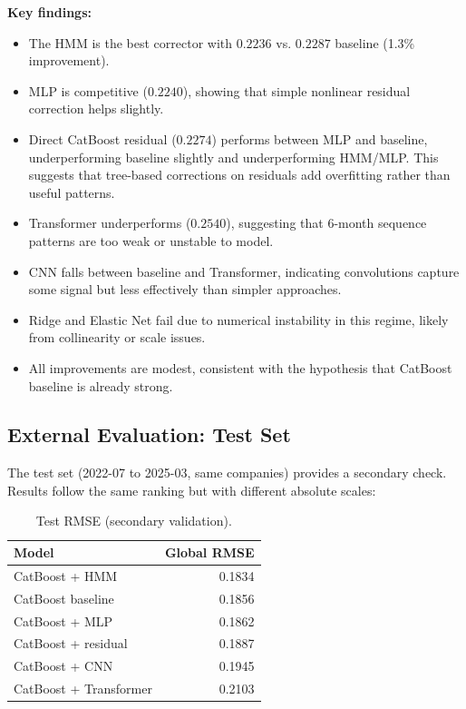 \documentclass[11pt]{article}
\begin{document}
\textbf{Key findings:}
\begin{itemize}[leftmargin=1.2em]
    \item The HMM is the best corrector with $0.2236$ vs. $0.2287$ baseline (1.3\% improvement).
    \item MLP is competitive ($0.2240$), showing that simple nonlinear residual correction helps slightly.
    \item Direct CatBoost residual ($0.2274$) performs between MLP and baseline, underperforming baseline slightly and underperforming HMM/MLP. This suggests that tree-based corrections on residuals add overfitting rather than useful patterns.
    \item Transformer underperforms ($0.2540$), suggesting that 6-month sequence patterns are too weak or unstable to model.
    \item CNN falls between baseline and Transformer, indicating convolutions capture some signal but less effectively than simpler approaches.
    \item Ridge and Elastic Net fail due to numerical instability in this regime, likely from collinearity or scale issues.
    \item All improvements are modest, consistent with the hypothesis that CatBoost baseline is already strong.
\end{itemize}

\subsection{External Evaluation: Test Set}
The test set (2022-07 to 2025-03, same companies) provides a secondary check. Results follow the same ranking but with different absolute scales:

\begin{table}[H]
\centering
\caption{Test RMSE (secondary validation).}
\begin{tabular}{l r}
\toprule
Model & Global RMSE \\
\midrule
CatBoost + HMM & 0.1834 \\
CatBoost baseline & 0.1856 \\
CatBoost + MLP & 0.1862 \\
CatBoost + residual & 0.1887 \\
CatBoost + CNN & 0.1945 \\
CatBoost + Transformer & 0.2103 \\
\bottomrule
\end{tabular}
\end{table}
\end{document}
